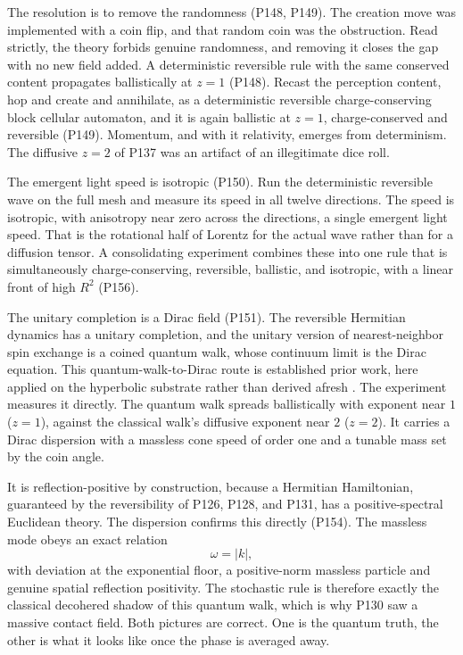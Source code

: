 The resolution is to remove the randomness (P148, P149). The creation move was implemented with a coin flip, and that random coin was the obstruction. Read strictly, the theory forbids genuine randomness, and removing it closes the gap with no new field added. A deterministic reversible rule with the same conserved content propagates ballistically at $z=1$ (P148). Recast the perception content, hop and create and annihilate, as a deterministic reversible charge-conserving block cellular automaton, and it is again ballistic at $z=1$, charge-conserved and reversible (P149). Momentum, and with it relativity, emerges from determinism. The diffusive $z=2$ of P137 was an artifact of an illegitimate dice roll.

The emergent light speed is isotropic (P150). Run the deterministic reversible wave on the full mesh and measure its speed in all twelve directions. The speed is isotropic, with anisotropy near zero across the directions, a single emergent light speed. That is the rotational half of Lorentz for the actual wave rather than for a diffusion tensor. A consolidating experiment combines these into one rule that is simultaneously charge-conserving, reversible, ballistic, and isotropic, with a linear front of high $R^2$ (P156).

The unitary completion is a Dirac field (P151). The reversible Hermitian dynamics has a unitary completion, and the unitary version of nearest-neighbor spin exchange is a coined quantum walk, whose continuum limit is the Dirac equation. This quantum-walk-to-Dirac route is established prior work, here applied on the hyperbolic substrate rather than derived afresh \cite{bisio2015,bisio2016,dariano2014,arrighi2014}. The experiment measures it directly. The quantum walk spreads ballistically with exponent near $1$ ($z=1$), against the classical walk's diffusive exponent near $2$ ($z=2$). It carries a Dirac dispersion with a massless cone speed of order one and a tunable mass set by the coin angle.

It is reflection-positive by construction, because a Hermitian Hamiltonian, guaranteed by the reversibility of P126, P128, and P131, has a positive-spectral Euclidean theory. The dispersion confirms this directly (P154). The massless mode obeys an exact relation
\begin{equation}
\omega = |k|,
\end{equation}
with deviation at the exponential floor, a positive-norm massless particle and genuine spatial reflection positivity. The stochastic rule is therefore exactly the classical decohered shadow of this quantum walk, which is why P130 saw a massive contact field. Both pictures are correct. One is the quantum truth, the other is what it looks like once the phase is averaged away.

